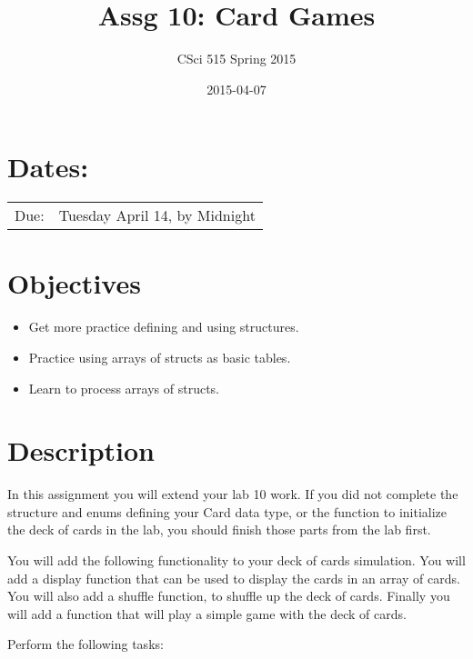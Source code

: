 \documentclass[11pt]{article}
\title{Assg 10: Card Games}
\author{CSci 515 Spring 2015}
\date{2015-04-07}
\begin{document}
\maketitle


\section*{Dates:}
\label{sec-1}


\begin{center}
\begin{tabular}{ll}
 Due:  &  Tuesday April 14, by Midnight  \\
\end{tabular}
\end{center}
\section*{Objectives}
\label{sec-2}

\begin{itemize}
\item Get more practice defining and using structures.
\item Practice using arrays of structs as basic tables.
\item Learn to process arrays of structs.
\end{itemize}
\section*{Description}
\label{sec-3}

In this assignment you will extend your lab 10 work.  If you did not
complete the structure and enums defining your Card data type, or the
function to initialize the deck of cards in the lab, you should finish
those parts from the lab first.

You will add the following functionality to your deck of cards
simulation.  You will add a display function that can be used to
display the cards in an array of cards.  You will also add a shuffle
function, to shuffle up the deck of cards.  Finally you will add
a function that will play a simple game with the deck of cards.

Perform the following tasks:
\end{document}
